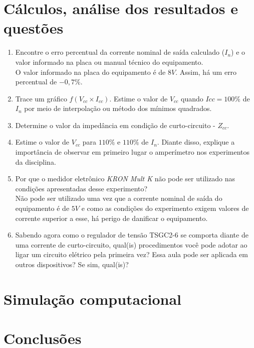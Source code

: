 \documentclass[a4paper,12pt,oneside,openany,table,xcdraw]{article}
\begin{document}
\section{Cálculos, análise dos resultados e questões} %
\begin{enumerate}[1)]
\item Encontre o erro percentual da corrente nominal de saída calculado ($I_n$) e o valor informado na placa ou manual técnico do equipamento.\\
O valor informado na placa do equipamento é de $8V$. Assim, há um erro percentual de $-0,7\%$.

\item Trace um gráfico $f(V_{cc}\times I_{cc})$. Estime o valor de $V_{cc}$ quando $Icc=100\%$ de $I_n$ por meio de interpolação ou método dos mínimos quadrados.\\

\item Determine o valor da impedância em condição de curto-circuito - $Z_{cc}$.\\

\item Estime o valor de $V_{cc}$ para $110\%$ e $110\%$ de $I_n$. Diante disso, explique a importância de observar em primeiro lugar o amperímetro nos experimentos da disciplina.\\

\item Por que o medidor eletrônico \emph{KRON Mult K} não pode ser utilizado nas condições apresentadas desse experimento?\\
Não pode ser utilizado uma vez que a corrente nominal de saída do equipamento é de $5V$ e como as condições do experimento exigem valores de corrente superior a esse, há perigo de danificar o equipamento.

\item Sabendo agora como o regulador de tensão TSGC2-6 se comporta diante de uma corrente de curto-circuito, qual(is) procedimentos você pode adotar ao ligar um circuito elétrico pela primeira vez? Essa aula pode ser aplicada em outros dispositivos? Se sim, qual(is)?\\

\end{enumerate}
\section{Simulação computacional} %

\section{Conclusões} %
\end{document}

